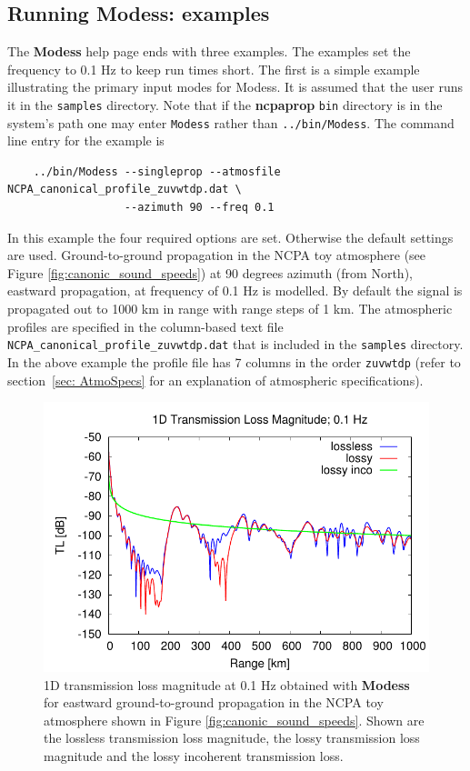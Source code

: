 \subsection{Running Modess: examples}
\label{sec: modess examples}

The \textbf{Modess} help page ends with three examples. The examples set the frequency to 0.1 Hz to keep run times short. The first is a simple example illustrating the primary input modes for Modess. It is assumed that the user runs it in the \verb+samples+ directory. Note that if the \textbf{ncpaprop} \verb+bin+ directory is in the system's path one may enter \verb+Modess+ rather than \verb+../bin/Modess+. The command line entry for the example is 
\begin{verbatim} 
    ../bin/Modess --singleprop --atmosfile NCPA_canonical_profile_zuvwtdp.dat \ 
                  --azimuth 90 --freq 0.1
\end{verbatim}
In this example the four required options are set. Otherwise the default settings are used. Ground-to-ground propagation in the NCPA toy atmosphere (see Figure \ref{fig:canonic_sound_speeds}) at 90 degrees azimuth (from North), eastward propagation, at frequency of 0.1 Hz is modelled. By default the signal is propagated out to 1000 km in range with range steps of 1 km. The atmospheric profiles are specified in the column-based text file \verb"NCPA_canonical_profile_zuvwtdp.dat" that is included in the \verb+samples+ directory. In the above example the profile file has 7 columns in the order \verb"zuvwtdp" (refer to section~\ref{sec: AtmoSpecs}  for an explanation of atmospheric specifications).

\begin{figure}[h]
\begin{center}
\includegraphics[scale=0.60]{figs/modess_ex1}
\end{center}
\caption{1D transmission loss magnitude at 0.1 Hz obtained with {\bf Modess} for eastward ground-to-ground propagation in the NCPA toy atmosphere shown in Figure \ref{fig:canonic_sound_speeds}. Shown are the lossless transmission loss magnitude, the lossy transmission loss magnitude and the lossy incoherent transmission loss.}
\label{fig: modess 1D tl}
\end{figure}

